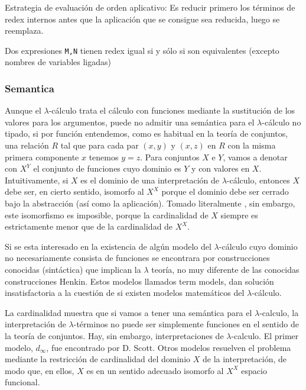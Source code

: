 Estrategia de evaluación de orden aplicativo:
Es reducir primero los términos de redex internos antes que la aplicación que se consigue sea reducida, luego se reemplaza.

\begin{thm}
Dos expresiones \texttt{M,N} tienen redex igual si y sólo si son equivalentes (excepto nombres de variables ligadas)
\end{thm}

\subsubsection{Semantica}

Aunque el $\lambda$-cálculo trata el cálculo con funciones mediante la sustitución de los valores para los argumentos, puede no admitir una semántica para el $\lambda$-cálculo no tipado, si por función entendemos, como es habitual en la teoría de conjuntos, una relación $R$ tal que para cada par $(x, y)$ y $(x, z)$ en $R$ con la misma primera componente $x$ tenemos $y = z$. Para conjuntos $X$ e $Y$, vamos a denotar con $X^Y$ el conjunto de funciones cuyo dominio es $Y$ y con valores en $X$. Intuitivamente, si $X$ es el dominio de una interpretación de 
$\lambda$-cálculo, entonces $X$ debe ser, en cierto sentido, isomorfo al $X^X$ porque el dominio debe ser cerrado bajo la abstracción (así como la aplicación). Tomado literalmente \cite{Lambda2013}, sin embargo, este isomorfismo es imposible, porque la cardinalidad de $X$ siempre es estrictamente menor que de la cardinalidad de $X^X$.

Si se esta interesado en la existencia de algún modelo del 
$\lambda$-cálculo cuyo dominio no necesariamente consista de funciones se encontrara por construcciones conocidas (sintáctica) que implican la $\lambda$ teoría, no muy diferente de las conocidas construcciones Henkin. Estos modelos llamados term models, dan solución insatisfactoria a la cuestión de si existen modelos matemáticos del $\lambda$-cálculo.

La cardinalidad muestra que si vamos a tener una semántica para el 
$\lambda$-calculo, la interpretación de $\lambda$-términos no puede ser simplemente funciones en el sentido de la teoría de conjuntos. 
Hay, sin embargo, interpretaciones de $\lambda$-calculo. 
El primer modelo, $d_{\infty}$, fue encontrado por D. Scott. Otros modelos resuelven el problema mediante la restricción de cardinalidad del dominio $X$ de la interpretación, de modo que, en ellos, $X$ es en un sentido adecuado isomorfo al $X^X$ espacio funcional.

